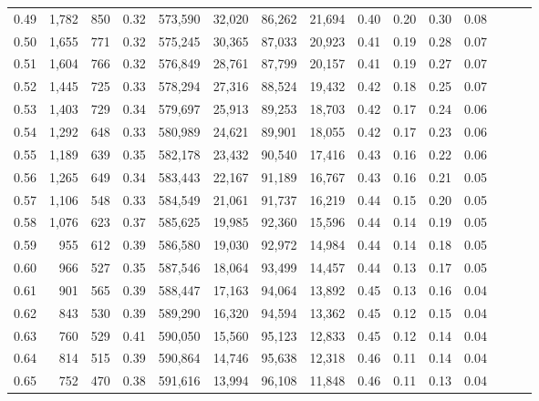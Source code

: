 \begin{tabular}{rrrrrrrrrrrrrrr}
0.49 &   1,782 &    850 &  0.32 &  573,590 &   32,020 &   86,262 &   21,694 &  0.40 &  0.20 &  0.30 &      0.08 \\
0.50 &   1,655 &    771 &  0.32 &  575,245 &   30,365 &   87,033 &   20,923 &  0.41 &  0.19 &  0.28 &      0.07 \\
0.51 &   1,604 &    766 &  0.32 &  576,849 &   28,761 &   87,799 &   20,157 &  0.41 &  0.19 &  0.27 &      0.07 \\
0.52 &   1,445 &    725 &  0.33 &  578,294 &   27,316 &   88,524 &   19,432 &  0.42 &  0.18 &  0.25 &      0.07 \\
0.53 &   1,403 &    729 &  0.34 &  579,697 &   25,913 &   89,253 &   18,703 &  0.42 &  0.17 &  0.24 &      0.06 \\
0.54 &   1,292 &    648 &  0.33 &  580,989 &   24,621 &   89,901 &   18,055 &  0.42 &  0.17 &  0.23 &      0.06 \\
0.55 &   1,189 &    639 &  0.35 &  582,178 &   23,432 &   90,540 &   17,416 &  0.43 &  0.16 &  0.22 &      0.06 \\
0.56 &   1,265 &    649 &  0.34 &  583,443 &   22,167 &   91,189 &   16,767 &  0.43 &  0.16 &  0.21 &      0.05 \\
0.57 &   1,106 &    548 &  0.33 &  584,549 &   21,061 &   91,737 &   16,219 &  0.44 &  0.15 &  0.20 &      0.05 \\
0.58 &   1,076 &    623 &  0.37 &  585,625 &   19,985 &   92,360 &   15,596 &  0.44 &  0.14 &  0.19 &      0.05 \\
0.59 &     955 &    612 &  0.39 &  586,580 &   19,030 &   92,972 &   14,984 &  0.44 &  0.14 &  0.18 &      0.05 \\
0.60 &     966 &    527 &  0.35 &  587,546 &   18,064 &   93,499 &   14,457 &  0.44 &  0.13 &  0.17 &      0.05 \\
0.61 &     901 &    565 &  0.39 &  588,447 &   17,163 &   94,064 &   13,892 &  0.45 &  0.13 &  0.16 &      0.04 \\
0.62 &     843 &    530 &  0.39 &  589,290 &   16,320 &   94,594 &   13,362 &  0.45 &  0.12 &  0.15 &      0.04 \\
0.63 &     760 &    529 &  0.41 &  590,050 &   15,560 &   95,123 &   12,833 &  0.45 &  0.12 &  0.14 &      0.04 \\
0.64 &     814 &    515 &  0.39 &  590,864 &   14,746 &   95,638 &   12,318 &  0.46 &  0.11 &  0.14 &      0.04 \\
0.65 &     752 &    470 &  0.38 &  591,616 &   13,994 &   96,108 &   11,848 &  0.46 &  0.11 &  0.13 &      0.04 \\

\end{tabular}
